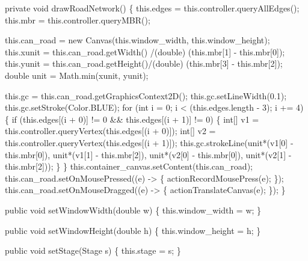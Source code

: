 \documentclass{article}
\def\nwendcode{\endtrivlist \endgroup}      %
\let\nwdocspar=\par
\begin{document}
\nwenddocs{}\endmoddef{}
private void drawRoadNetwork() \{
  this.edges    = this.controller.queryAllEdges();
  this.mbr      = this.controller.queryMBR();

  this.can_road = new Canvas(this.window_width, this.window_height);
  this.xunit    = this.can_road.getWidth() /(double) (this.mbr[1] - this.mbr[0]);
  this.yunit    = this.can_road.getHeight()/(double) (this.mbr[3] - this.mbr[2]);
  double unit   = Math.min(xunit, yunit);

  this.gc = this.can_road.getGraphicsContext2D();
  this.gc.setLineWidth(0.1);
  this.gc.setStroke(Color.BLUE);
  for (int i = 0; i < (this.edges.length - 3); i += 4) \{
    if (this.edges[(i + 0)] != 0 && this.edges[(i + 1)] != 0) \{
      int[] v1 = this.controller.queryVertex(this.edges[(i + 0)]);
      int[] v2 = this.controller.queryVertex(this.edges[(i + 1)]);
      this.gc.strokeLine(unit*(v1[0] - this.mbr[0]), unit*(v1[1] - this.mbr[2]),
                         unit*(v2[0] - this.mbr[0]), unit*(v2[1] - this.mbr[2]));
    \}
  \}
  this.container_canvas.setContent(this.can_road);
  this.can_road.setOnMousePressed((e) -> \{ actionRecordMousePress(e); \});
  this.can_road.setOnMouseDragged((e) -> \{ actionTranslateCanvas(e); \});
\}
\nwendcode{}\nwdocspar

\nwenddocs{}\endmoddef{}
public void setWindowWidth(double w) \{
  this.window_width = w;
\}
\nwendcode{}\nwdocspar

\nwenddocs{}\endmoddef{}
public void setWindowHeight(double h) \{
  this.window_height = h;
\}
\nwendcode{}\nwdocspar

\nwenddocs{}\endmoddef{}
public void setStage(Stage s) \{
  this.stage = s;
\}
\end{document}
